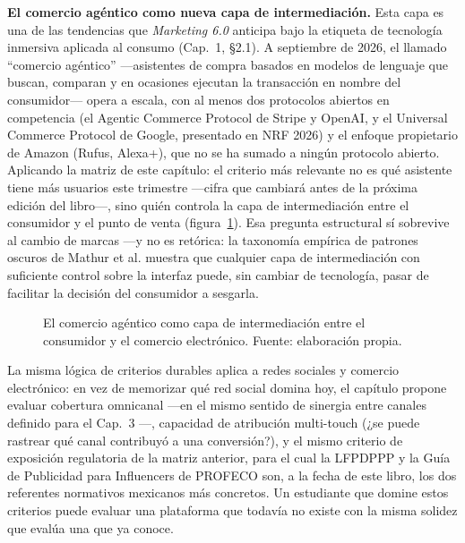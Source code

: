 \begin{cajaFrontera}
\textbf{El comercio agéntico como nueva capa de intermediación.} Esta capa
es una de las tendencias que \textit{Marketing 6.0} anticipa bajo la
etiqueta de tecnología inmersiva aplicada al consumo
\parencite{kotler2024marketing6} (Cap.~1, §2.1). A
septiembre de 2026, el llamado \enquote{comercio agéntico} —asistentes de
compra basados en modelos de lenguaje que buscan, comparan y en ocasiones
ejecutan la transacción en nombre del consumidor— opera a escala, con al
menos dos protocolos abiertos en competencia (el Agentic Commerce Protocol
de Stripe y OpenAI, y el Universal Commerce Protocol de Google, presentado
en NRF 2026) y el enfoque propietario de Amazon (Rufus, Alexa+), que no se
ha sumado a ningún protocolo abierto. Aplicando la matriz de este capítulo:
el criterio más relevante no es qué asistente tiene más usuarios este
trimestre —cifra que cambiará antes de la próxima edición del libro—, sino
quién controla la capa de intermediación entre el consumidor y el punto de
venta (figura~\ref{fig:cap04-agentico}). Esa pregunta estructural sí
sobrevive al cambio de marcas —y no es retórica: la taxonomía empírica de
patrones oscuros de Mathur et al. \parencite{mathur2019} muestra que
cualquier capa de intermediación con suficiente control sobre la interfaz
puede, sin cambiar de tecnología, pasar de facilitar la decisión del
consumidor a sesgarla.
\end{cajaFrontera}

\begin{figure}[!htb]
  \centering
  
  \caption{El comercio agéntico como capa de intermediación entre el
  consumidor y el comercio electrónico. Fuente: elaboración propia.}
  \label{fig:cap04-agentico}
\end{figure}

La misma lógica de criterios durables aplica a redes sociales y comercio
electrónico: en vez de memorizar qué red social domina hoy, el capítulo
propone evaluar cobertura omnicanal —en el mismo sentido de sinergia entre
canales definido para el Cap.~3 \parencite{verhoef2015}—, capacidad de
atribución multi-touch (¿se puede rastrear qué canal contribuyó a una
conversión?), y el mismo criterio de exposición regulatoria de la matriz
anterior, para el cual la LFPDPPP \parencite{dof_lfpdppp2025} y la Guía de
Publicidad para Influencers de PROFECO \parencite{profeco2023influencers}
son, a la fecha de este libro, los dos referentes normativos mexicanos más
concretos. Un estudiante que domine estos criterios puede evaluar una
plataforma que todavía no existe con la misma solidez que evalúa una que ya
conoce.

